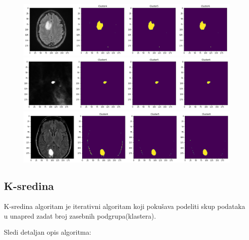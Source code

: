\documentclass{article}
\begin{document}
\begin{figure}[h!]
\centerline{\includegraphics[scale=0.45]{images/segmented_fuzzy_c_means_tumor4.png}}
\centerline{\includegraphics[scale=0.45]{images/segmented_fuzzy_c_means_tumor5.png}}
\centerline{\includegraphics[scale=0.45]{images/segmented_fuzzy_c_means_tumor6.png}}
\end{figure}


\subsection{\selectfont K-sredina}

K-sredina algoritam je iterativni algoritam koji poku\v{s}ava podeliti skup podataka u unapred zadat broj zasebnih podgrupa(klastera).

Sledi detaljan opis algoritma:
\end{document}
